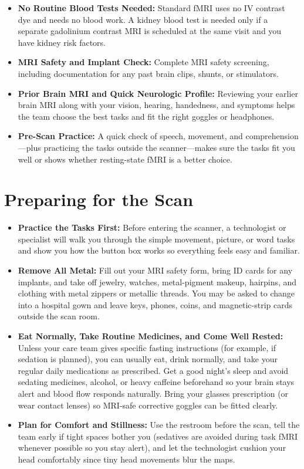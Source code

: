 \begin{itemize}
    \item \textbf{No Routine Blood Tests Needed:} Standard fMRI uses no IV contrast dye and needs no blood work. A kidney blood test is needed only if a separate gadolinium contrast MRI is scheduled at the same visit and you have kidney risk factors.
    \item \textbf{MRI Safety and Implant Check:} Complete MRI safety screening, including documentation for any past brain clips, shunts, or stimulators.
    \item \textbf{Prior Brain MRI and Quick Neurologic Profile:} Reviewing your earlier brain MRI along with your vision, hearing, handedness, and symptoms helps the team choose the best tasks and fit the right goggles or headphones.
    \item \textbf{Pre-Scan Practice:} A quick check of speech, movement, and comprehension---plus practicing the tasks outside the scanner---makes sure the tasks fit you well or shows whether resting-state fMRI is a better choice.
\end{itemize}

\section{Preparing for the Scan}

\begin{itemize}
    \item \textbf{Practice the Tasks First:} Before entering the scanner, a technologist or specialist will walk you through the simple movement, picture, or word tasks and show you how the button box works so everything feels easy and familiar.
    \item \textbf{Remove All Metal:} Fill out your MRI safety form, bring ID cards for any implants, and take off jewelry, watches, metal-pigment makeup, hairpins, and clothing with metal zippers or metallic threads. You may be asked to change into a hospital gown and leave keys, phones, coins, and magnetic-strip cards outside the scan room.
    \item \textbf{Eat Normally, Take Routine Medicines, and Come Well Rested:} Unless your care team gives specific fasting instructions (for example, if sedation is planned), you can usually eat, drink normally, and take your regular daily medications as prescribed. Get a good night's sleep and avoid sedating medicines, alcohol, or heavy caffeine beforehand so your brain stays alert and blood flow responds naturally. Bring your glasses prescription (or wear contact lenses) so MRI-safe corrective goggles can be fitted clearly.
    \item \textbf{Plan for Comfort and Stillness:} Use the restroom before the scan, tell the team early if tight spaces bother you (sedatives are avoided during task fMRI whenever possible so you stay alert), and let the technologist cushion your head comfortably since tiny head movements blur the maps.
\end{itemize}

